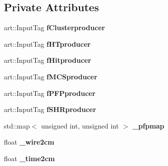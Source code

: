 \subsection*{Private Attributes}
\begin{DoxyCompactItemize}
\item 
art\+::\+Input\+Tag {\bfseries f\+Clusterproducer}\hypertarget{classProtonTruthStudies_a449eaf61be28710b7da099e2e47f4df0}{}\label{classProtonTruthStudies_a449eaf61be28710b7da099e2e47f4df0}

\item 
art\+::\+Input\+Tag {\bfseries f\+H\+Tproducer}\hypertarget{classProtonTruthStudies_a9e2b91c4f0c9e51b9109161bb057e1ed}{}\label{classProtonTruthStudies_a9e2b91c4f0c9e51b9109161bb057e1ed}

\item 
art\+::\+Input\+Tag {\bfseries f\+Hitproducer}\hypertarget{classProtonTruthStudies_a6cb9b9c407c6ff435b06ff6e85cbf287}{}\label{classProtonTruthStudies_a6cb9b9c407c6ff435b06ff6e85cbf287}

\item 
art\+::\+Input\+Tag {\bfseries f\+M\+C\+Sproducer}\hypertarget{classProtonTruthStudies_a95d4d9f2ae2b26ad5ecc2a5aaf9bbf64}{}\label{classProtonTruthStudies_a95d4d9f2ae2b26ad5ecc2a5aaf9bbf64}

\item 
art\+::\+Input\+Tag {\bfseries f\+P\+F\+Pproducer}\hypertarget{classProtonTruthStudies_ad862ed1c8a009a9a5a4cf6a937445573}{}\label{classProtonTruthStudies_ad862ed1c8a009a9a5a4cf6a937445573}

\item 
art\+::\+Input\+Tag {\bfseries f\+S\+H\+Rproducer}\hypertarget{classProtonTruthStudies_aeb2f7b7810bcfd54c037573b9fd42e46}{}\label{classProtonTruthStudies_aeb2f7b7810bcfd54c037573b9fd42e46}

\item 
std\+::map$<$ unsigned int, unsigned int $>$ {\bfseries \+\_\+pfpmap}\hypertarget{classProtonTruthStudies_a604911517ec46b7fb7b0c5e974763b9b}{}\label{classProtonTruthStudies_a604911517ec46b7fb7b0c5e974763b9b}

\item 
float {\bfseries \+\_\+wire2cm}\hypertarget{classProtonTruthStudies_ae8f7874eb3f594d2d654e64ff6fd99be}{}\label{classProtonTruthStudies_ae8f7874eb3f594d2d654e64ff6fd99be}

\item 
float {\bfseries \+\_\+time2cm}\hypertarget{classProtonTruthStudies_abd18b2c294786edcfb6a49053e1ed9a7}{}\label{classProtonTruthStudies_abd18b2c294786edcfb6a49053e1ed9a7}


\end{DoxyCompactItemize}
